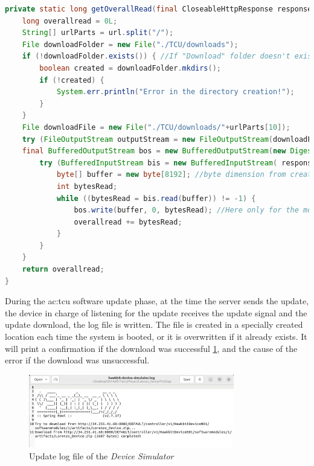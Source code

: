 \begin{lstlisting}[language=Java, caption={Downloading files from the \gls{ac:ota} server to the specific device simulator folder}, label=lst:OverallReadHDS]
private static long getOverallRead(final CloseableHttpResponse response, final MessageDigest md, final String url) throws IOException {
    long overallread = 0L;
    String[] urlParts = url.split("/");
    File downloadFolder = new File("./TCU/downloads");
    if (!downloadFolder.exists()) { //If "Download" folder doesn't exist
        boolean created = downloadFolder.mkdirs();
        if (!created) {
            System.err.println("Error in the directory creation!");
        }
    }
    File downloadFile = new File("./TCU/downloads/"+urlParts[10]);
    try (FileOutputStream outputStream = new FileOutputStream(downloadFile);
    final BufferedOutputStream bos = new BufferedOutputStream(new DigestOutputStream(outputStream, md))) {
        try (BufferedInputStream bis = new BufferedInputStream( response.getEntity().getContent())) {
            byte[] buffer = new byte[8192]; //byte dimension from createBuffer of ByteStream.class
            int bytesRead;
            while ((bytesRead = bis.read(buffer)) != -1) {
                bos.write(buffer, 0, bytesRead); //Here only for the md hash correctness.
                overallread += bytesRead;
            }
        }
    }
    return overallread;
}
\end{lstlisting}

During the \gls{ac:tcu} software update phase, at the time the server sends the update, the device in charge of listening for the update receives the update signal and the update download, the log file is written. The file is created in a specially created location each time the system is booted, or it is overwritten if it already exists. It will print a confirmation if the download was successful \ref{fig:update_log_HDS}, and the cause of the error if the download was unsuccessful.

\begin{figure}[h]  %
    \centering
    \includegraphics[width=0.8\textwidth]{images/update_log_HDS.png}  %
    \caption{Update log file of the \textit{Device Simulator}}
    \label{fig:update_log_HDS}
\end{figure} 

